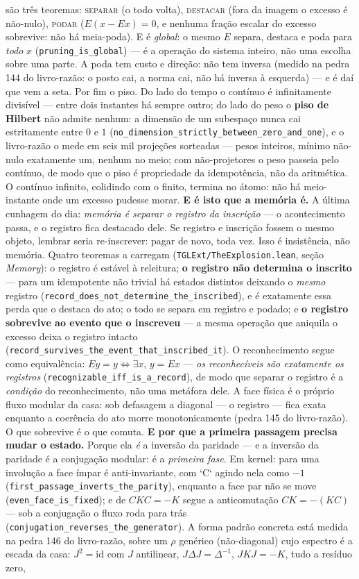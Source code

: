 \documentclass[11pt]{article}
\theoremstyle{definition}\newtheorem{deriv}{Derivação}
\begin{document}
são três teoremas: \textsc{separar} (o todo volta), \textsc{destacar} (fora da imagem o excesso é não-nulo), \textsc{podar} ($E(x-Ex)=0$, e nenhuma fração escalar do excesso sobrevive: não há meia-poda). E é \emph{global}: o mesmo $E$ separa, destaca e poda para \emph{todo} $x$ (\texttt{pruning\_is\_global}) --- é a operação do sistema inteiro, não uma escolha sobre uma parte. A poda tem custo e direção: não tem inversa (medido na pedra 144 do livro-razão: o posto cai, a norma cai, não há inversa à esquerda) --- e é daí que vem a seta. Por fim o piso. Do lado do tempo o contínuo é infinitamente divisível --- entre dois instantes há sempre outro; do lado do peso o \textbf{piso de Hilbert} não admite nenhum: a dimensão de um subespaço nunca cai estritamente entre $0$ e $1$ (\texttt{no\_dimension\_strictly\_between\_zero\_and\_one}), e o livro-razão o mede em seis mil projeções sorteadas --- pesos inteiros, mínimo não-nulo exatamente um, nenhum no meio; com não-projetores o peso passeia pelo contínuo, de modo que o piso é propriedade da idempotência, não da aritmética. O contínuo infinito, colidindo com o finito, termina no átomo: não há meio-instante onde um excesso pudesse morar. \textbf{E é isto que a memória é.} A última cunhagem do dia: \emph{memória é separar o registro da inscrição} --- o acontecimento passa, e o registro fica destacado dele. Se registro e inscrição fossem o mesmo objeto, lembrar seria re-inscrever: pagar de novo, toda vez. Isso é insistência, não memória. Quatro teoremas a carregam (\texttt{TGLExt/TheExplosion.lean}, seção \emph{Memory}): o registro é estável à releitura; \textbf{o registro não determina o inscrito} --- para um idempotente não trivial há estados distintos deixando o \emph{mesmo} registro (\texttt{record\_does\_not\_determine\_the\_inscribed}), e é exatamente essa perda que o destaca do ato; o todo se separa em registro e podado; e \textbf{o registro sobrevive ao evento que o inscreveu} --- a mesma operação que aniquila o excesso deixa o registro intacto (\texttt{record\_survives\_the\_event\_that\_inscribed\_it}). O reconhecimento segue como equivalência: $Ey=y \iff \exists x,\, y=Ex$ --- \emph{os reconhecíveis são exatamente os registros} (\texttt{recognizable\_iff\_is\_a\_record}), de modo que separar o registro é a \emph{condição} do reconhecimento, não uma metáfora dele. A face física é o próprio fluxo modular da casa: sob defasagem a diagonal --- o registro --- fica exata enquanto a coerência do ato morre monotonicamente (pedra 145 do livro-razão). O que sobrevive é o que comuta. \textbf{E por que a primeira passagem precisa mudar o estado.} Porque ela \emph{é} a inversão da paridade --- e a inversão da paridade é a conjugação modular: é a \emph{primeira fase}. Em kernel: para uma involução a face ímpar é anti-invariante, com `C` agindo nela como $-1$ (\texttt{first\_passage\_inverts\_the\_parity}), enquanto a face par não se move (\texttt{even\_face\_is\_fixed}); e de $CKC=-K$ segue a anticomutação $CK=-(KC)$ --- sob a conjugação o fluxo roda para trás (\texttt{conjugation\_reverses\_the\_generator}). A forma padrão concreta está medida na pedra 146 do livro-razão, sobre um $\rho$ genérico (não-diagonal) cujo espectro é a escada da casa: $J^2=\mathrm{id}$ com $J$ antilinear, $J\Delta J=\Delta^{-1}$, $JKJ=-K$, tudo a resíduo zero, 
\end{document}
